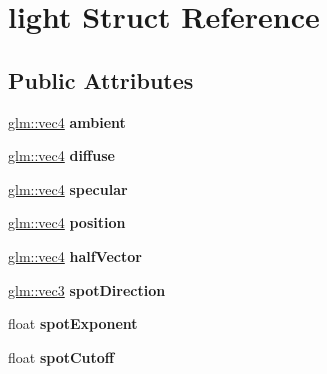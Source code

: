 \hypertarget{structlight}{\section{light Struct Reference}
\label{structlight}
}
\subsection*{Public Attributes}
\begin{DoxyCompactItemize}
\item 
\hypertarget{structlight_a55272e98f6354987f671e462020a114f}{\hyperlink{group__core__types_ga5881b1b022d7fd1b7218f5916532dd02}{glm\-::vec4} {\bfseries ambient}}\label{structlight_a55272e98f6354987f671e462020a114f}

\item 
\hypertarget{structlight_a3c5ae9ee6f2d72bd13b0f11f7dbc8802}{\hyperlink{group__core__types_ga5881b1b022d7fd1b7218f5916532dd02}{glm\-::vec4} {\bfseries diffuse}}\label{structlight_a3c5ae9ee6f2d72bd13b0f11f7dbc8802}

\item 
\hypertarget{structlight_a03121f7e82d16d3b67fa0cd3efc30eb6}{\hyperlink{group__core__types_ga5881b1b022d7fd1b7218f5916532dd02}{glm\-::vec4} {\bfseries specular}}\label{structlight_a03121f7e82d16d3b67fa0cd3efc30eb6}

\item 
\hypertarget{structlight_a9cb7c5d031dcfd66ff10480aa021235a}{\hyperlink{group__core__types_ga5881b1b022d7fd1b7218f5916532dd02}{glm\-::vec4} {\bfseries position}}\label{structlight_a9cb7c5d031dcfd66ff10480aa021235a}

\item 
\hypertarget{structlight_af8848393784e35f096bea1a663ba1a9c}{\hyperlink{group__core__types_ga5881b1b022d7fd1b7218f5916532dd02}{glm\-::vec4} {\bfseries half\-Vector}}\label{structlight_af8848393784e35f096bea1a663ba1a9c}

\item 
\hypertarget{structlight_a24ba4cefe6d7757dd48be420ac70713e}{\hyperlink{group__core__types_ga1c47e8b3386109bc992b6c48e91b0be7}{glm\-::vec3} {\bfseries spot\-Direction}}\label{structlight_a24ba4cefe6d7757dd48be420ac70713e}

\item 
\hypertarget{structlight_a537f6f54361118f6211c99c26716a848}{float {\bfseries spot\-Exponent}}\label{structlight_a537f6f54361118f6211c99c26716a848}

\item 
\hypertarget{structlight_ae9caaef52485008773b4169e8ca71def}{float {\bfseries spot\-Cutoff}}\label{structlight_ae9caaef52485008773b4169e8ca71def}


\end{DoxyCompactItemize}
